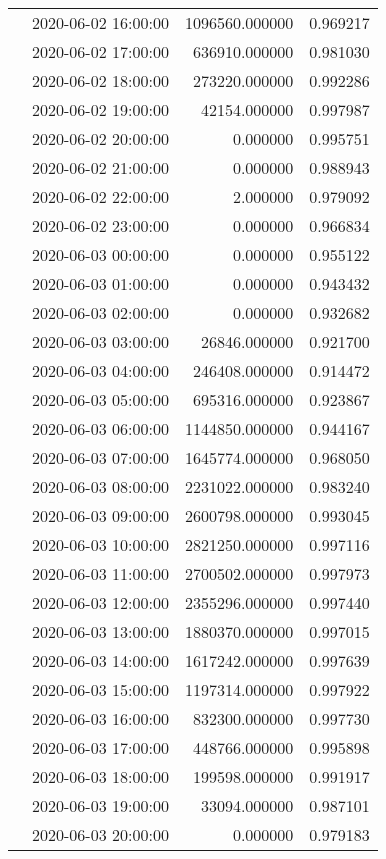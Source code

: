 \begin{tabular}{llrr}
 & 2020-06-02 16:00:00 & 1096560.000000 & 0.969217 \\
 & 2020-06-02 17:00:00 & 636910.000000 & 0.981030 \\
 & 2020-06-02 18:00:00 & 273220.000000 & 0.992286 \\
 & 2020-06-02 19:00:00 & 42154.000000 & 0.997987 \\
 & 2020-06-02 20:00:00 & 0.000000 & 0.995751 \\
 & 2020-06-02 21:00:00 & 0.000000 & 0.988943 \\
 & 2020-06-02 22:00:00 & 2.000000 & 0.979092 \\
 & 2020-06-02 23:00:00 & 0.000000 & 0.966834 \\
 & 2020-06-03 00:00:00 & 0.000000 & 0.955122 \\
 & 2020-06-03 01:00:00 & 0.000000 & 0.943432 \\
 & 2020-06-03 02:00:00 & 0.000000 & 0.932682 \\
 & 2020-06-03 03:00:00 & 26846.000000 & 0.921700 \\
 & 2020-06-03 04:00:00 & 246408.000000 & 0.914472 \\
 & 2020-06-03 05:00:00 & 695316.000000 & 0.923867 \\
 & 2020-06-03 06:00:00 & 1144850.000000 & 0.944167 \\
 & 2020-06-03 07:00:00 & 1645774.000000 & 0.968050 \\
 & 2020-06-03 08:00:00 & 2231022.000000 & 0.983240 \\
 & 2020-06-03 09:00:00 & 2600798.000000 & 0.993045 \\
 & 2020-06-03 10:00:00 & 2821250.000000 & 0.997116 \\
 & 2020-06-03 11:00:00 & 2700502.000000 & 0.997973 \\
 & 2020-06-03 12:00:00 & 2355296.000000 & 0.997440 \\
 & 2020-06-03 13:00:00 & 1880370.000000 & 0.997015 \\
 & 2020-06-03 14:00:00 & 1617242.000000 & 0.997639 \\
 & 2020-06-03 15:00:00 & 1197314.000000 & 0.997922 \\
 & 2020-06-03 16:00:00 & 832300.000000 & 0.997730 \\
 & 2020-06-03 17:00:00 & 448766.000000 & 0.995898 \\
 & 2020-06-03 18:00:00 & 199598.000000 & 0.991917 \\
 & 2020-06-03 19:00:00 & 33094.000000 & 0.987101 \\
 & 2020-06-03 20:00:00 & 0.000000 & 0.979183 \\

\end{tabular}
